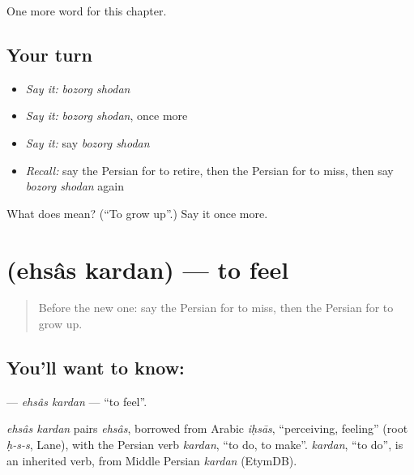 \begin{grammarlens}[title={What you've built}]
One more word for this chapter.
\end{grammarlens}

\subsection*{Your turn}
\begin{itemize}
\raggedright
  \item \emph{Say it:} \emph{bozorg shodan}
  \item \emph{Say it:} \emph{bozorg shodan}, once more
  \item \emph{Say it:} say \emph{bozorg shodan}
  \item \emph{Recall:} say the Persian for to retire, then the Persian for to miss, then say \emph{bozorg shodan} again
\end{itemize}

\begin{tcolorbox}[breakable,colback=teal!4,colframe=teal!35!black,title={Before you move on}]
What does   mean? (\textquotedblleft{}To grow up\textquotedblright{}.) Say it once more.
\end{tcolorbox}
\section[\texorpdfstring{\fa{احساس} \fa{کردن} (ehsâs kardan)}{احساس کردن (ehsâs kardan)}]{  (ehsâs kardan) — to feel}

\label{lesson:FA-C257-ehsas-kardan}



\begin{quote}
Before the new one: say the Persian for to miss, then the Persian for to grow up.
\end{quote}

\subsection*{You'll want to know:  }
\textbf{ } — \emph{ehsâs kardan} — \textquotedblleft{}to feel\textquotedblright{}.

\begin{cousinweb}
\emph{ehsâs kardan} pairs \emph{ehsâs}, borrowed from Arabic \emph{iḥsās}, \textquotedblleft{}perceiving, feeling\textquotedblright{} (root \emph{ḥ-s-s}, Lane), with the Persian verb \emph{kardan}, \textquotedblleft{}to do, to make\textquotedblright{}. \emph{kardan}, \textquotedblleft{}to do\textquotedblright{}, is an inherited verb, from Middle Persian \emph{kardan} (EtymDB).
\end{cousinweb}

